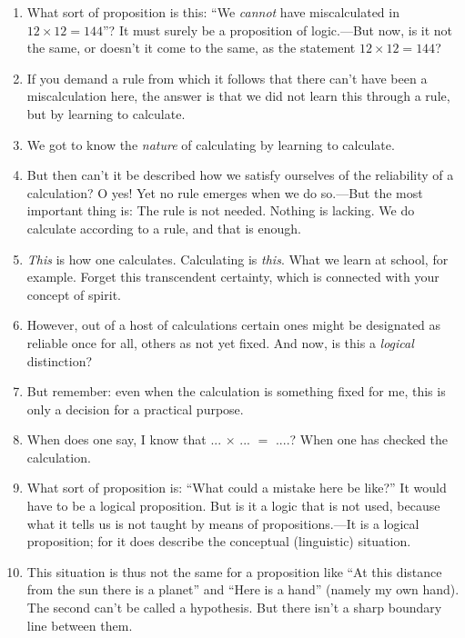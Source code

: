 \documentclass{book}
\begin{document}
\begin{enumerate}
\item
What sort of proposition is this: ``We \emph{cannot} have miscalculated in
$12{\times}12=144$''? It must surely be a proposition of logic.---But now, is
it not the same, or doesn't it come to the same, as the statement
$12{\times}12=144$?

\item
If you demand a rule from which it follows that there can't have been a
miscalculation here, the answer is that we did not learn this through a rule,
but by learning to calculate.

\item
We got to know the \emph{nature} of calculating by learning to calculate.

\item
But then can't it be described how we satisfy ourselves of the reliability of a
calculation? O yes! Yet no rule emerges when we do so.---But the most important
thing is: The rule is not needed. Nothing is lacking. We do calculate according
to a rule, and that is enough.

\item
\emph{This} is how one calculates. Calculating is \emph{this}. What we learn at
school, for example. Forget this transcendent certainty, which is connected
with your concept of spirit.

\item
However, out of a host of calculations certain ones might be designated as
reliable once for all, others as not yet fixed. And now, is this a
\emph{logical} distinction?

\item
But remember: even when the calculation is something fixed for me, this is only
a decision for a practical purpose.

\item
When does one say, I know that ... $\times$ ... $=$ ....? When one has checked
the calculation.

\item
What sort of proposition is: ``What could a mistake here be like?'' It would
have to be a logical proposition. But is it a logic that is not used, because
what it tells us is not taught by means of propositions.---It is a logical
proposition; for it does describe the conceptual (linguistic) situation.

\item
This situation is thus not the same for a proposition like ``At this distance
from the sun there is a planet'' and ``Here is a hand'' (namely my own hand).
The second can't be called a hypothesis. But there isn't a sharp boundary line
between them.


\end{enumerate}
\end{document}
